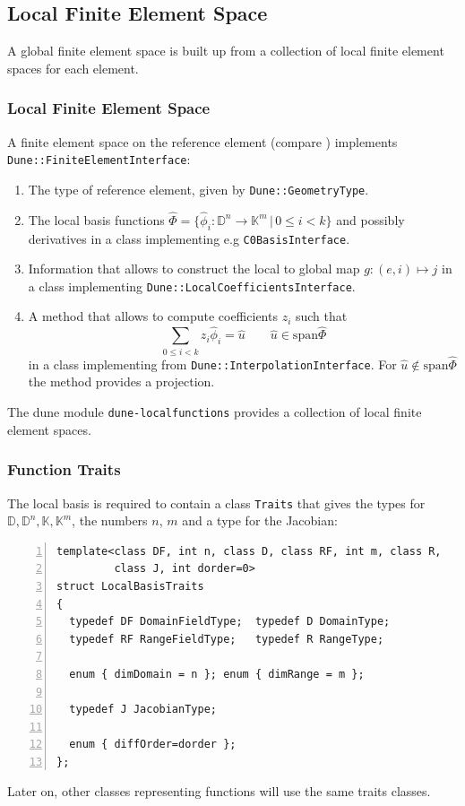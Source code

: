 \subsection{Local Finite Element Space}

A global finite element space is built up from a collection of local
finite element spaces for each element.

\begin{frame}
\frametitle{Local Finite Element Space}
A finite element space on the reference element (compare \cite{Ciarlet}) 
implements \lstinline{Dune::FiniteElementInterface}:
\begin{enumerate}
\item The type of reference element, given by \lstinline{Dune::GeometryType}.
\item The local basis functions
$\hat\Phi = \{\hat\phi_i : \mathbb{D}^n \to \mathbb{K}^m \,|\, 0\leq i < k\}$
and possibly derivatives in a class implementing e.g \lstinline{C0BasisInterface}.
\item Information that allows to construct the local to global map $g:
(e,i) \mapsto j$ in a class implementing \lstinline{Dune::LocalCoefficientsInterface}. 
\item A method that allows to compute coefficients $z_i$ such that
\begin{equation*}
\sum_{0\leq i < k} z_i \hat\phi_i = \hat{u} \qquad \hat{u}\in\text{span}\hat\Phi 
\end{equation*} 
in a class implementing
from \lstinline{Dune::InterpolationInterface}. For
$\hat{u}\not\in\text{span}\hat\Phi$ the method provides a projection.
\end{enumerate}
The dune module \lstinline{dune-localfunctions} provides a
collection of local finite element spaces.
\end{frame}

\begin{frame}[fragile]
\frametitle{Function Traits}
The local basis is required to contain a class \lstinline{Traits} that
gives the types for
$\mathbb{D}, \mathbb{D}^n, \mathbb{K}, \mathbb{K}^m$, the numbers $n$,
$m$ and a type for the Jacobian:
\begin{lstlisting}[basicstyle=\scriptsize,numbers=left, 
numberstyle=\tiny, numbersep=5pt]
template<class DF, int n, class D, class RF, int m, class R, 
         class J, int dorder=0>
struct LocalBasisTraits 
{
  typedef DF DomainFieldType;  typedef D DomainType;
  typedef RF RangeFieldType;   typedef R RangeType;

  enum { dimDomain = n }; enum { dimRange = m }; 

  typedef J JacobianType;

  enum { diffOrder=dorder };
};
\end{lstlisting}
Later on, other classes representing functions will use the same
traits classes.
\end{frame}

